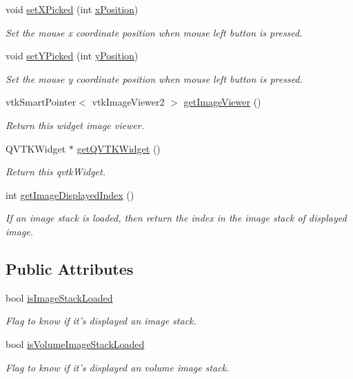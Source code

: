 \begin{DoxyCompactItemize}
\item 
void \hyperlink{class_q_v_t_k_image_widget_a088f422bce686308654f8c0899c1780f}{set\-X\-Picked} (int \hyperlink{class_q_v_t_k_image_widget_afd88ea5dbed175232b0c15cbe4cdca89}{x\-Position})
\begin{DoxyCompactList}\small\item\em Set the mouse x coordinate position when mouse left button is pressed. \end{DoxyCompactList}\item 
void \hyperlink{class_q_v_t_k_image_widget_a33c482cc6629c52762f27649e39f6006}{set\-Y\-Picked} (int \hyperlink{class_q_v_t_k_image_widget_a6724caff3a614db8321deaa70532255c}{y\-Position})
\begin{DoxyCompactList}\small\item\em Set the mouse y coordinate position when mouse left button is pressed. \end{DoxyCompactList}\item 
vtk\-Smart\-Pointer$<$ vtk\-Image\-Viewer2 $>$ \hyperlink{class_q_v_t_k_image_widget_aaa03d39486c547c29d54127cf936c884}{get\-Image\-Viewer} ()
\begin{DoxyCompactList}\small\item\em Return this widget image viewer. \end{DoxyCompactList}\item 
Q\-V\-T\-K\-Widget $\ast$ \hyperlink{class_q_v_t_k_image_widget_a41d916b555961f04dbdb571d8263c515}{get\-Q\-V\-T\-K\-Widget} ()
\begin{DoxyCompactList}\small\item\em Return this qvtk\-Widget. \end{DoxyCompactList}\item 
int \hyperlink{class_q_v_t_k_image_widget_ae41186ba6e99598e4ad4380f7d7ef638}{get\-Image\-Displayed\-Index} ()
\begin{DoxyCompactList}\small\item\em If an image stack is loaded, then return the index in the image stack of displayed image. \end{DoxyCompactList}\end{DoxyCompactItemize}
\subsection*{Public Attributes}
\begin{DoxyCompactItemize}
\item 
bool \hyperlink{class_q_v_t_k_image_widget_ac1af73fa525569f5ec5d581561b379a3}{is\-Image\-Stack\-Loaded}
\begin{DoxyCompactList}\small\item\em Flag to know if it's displayed an image stack. \end{DoxyCompactList}\item 
bool \hyperlink{class_q_v_t_k_image_widget_a9d3b5fe40f1135532c480fdb2ca9239d}{is\-Volume\-Image\-Stack\-Loaded}
\begin{DoxyCompactList}\small\item\em Flag to know if it's displayed an volume image stack. \end{DoxyCompactList}\end{DoxyCompactItemize}

